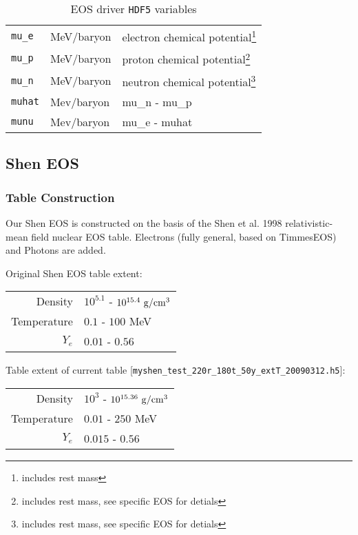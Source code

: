 \documentclass[10pt,nofootinbib]{article}
\newcommand{\code}[1]{\texttt{#1}}
\newenvironment{xaroundtbl}{\begin{flushleft}
  \renewcommand{\footnoterule}{}
  \begin{minipage}{\linewidth}
  \begin{center}}%
 {\end{center}\end{minipage}\end{flushleft}}
\begin{document}
\begin{table}[ht]
\begin{xaroundtbl}
\begin{tabular}{lll}
\code{mu\_e} & MeV/baryon & electron chemical
potential\footnote{includes rest mass}\\[0.2mm]
\code{mu\_p} & MeV/baryon & proton chemical potential\footnote{includes rest mass, see specific EOS for detials}\\[0.2mm]
\code{mu\_n} & MeV/baryon & neutron chemical potential\footnote{includes rest mass, see specific EOS for detials}\\[0.2mm]
\code{muhat} & Mev/baryon & mu\_n - mu\_p\\[0.2mm]
\code{munu} & Mev/baryon & mu\_e - muhat
\end{tabular}
\end{xaroundtbl}
\caption{EOS driver \code{HDF5} variables}\label{tab:eosvariables}
\end{table} 



\subsection{Shen EOS}

\subsubsection{Table Construction}                

Our Shen EOS is constructed on the basis of the Shen et al. 1998
relativistic-mean field nuclear EOS table. Electrons (fully general,
based on TimmesEOS) and Photons are added.
\newline

Original Shen EOS table extent:
\begin{table}[ht]
\begin{tabular}{r|l}
Density & $10^{5.1}$ - $10^{15.4}\ \rm{g}/\rm{cm}^3$ \\[0.2mm]
Temperature & $0.1$ - $100$ MeV \\[0.2mm]
$Y_e$ & $0.01$ - $0.56$
\end{tabular}
\end{table}

Table extent of current table [\code{myshen\_test\_220r\_180t\_50y\_extT\_20090312.h5}]:
\begin{table}[ht]
\begin{tabular}{r|l}
Density & $10^{3}$ - $10^{15.36}\ \rm{g}/\rm{cm}^3$ \\[0.2mm]
Temperature & $0.01$ - $250$ MeV \\[0.2mm]
$Y_e$ & $0.015$ - $0.56$
\end{tabular}
\end{table}
\end{document}
